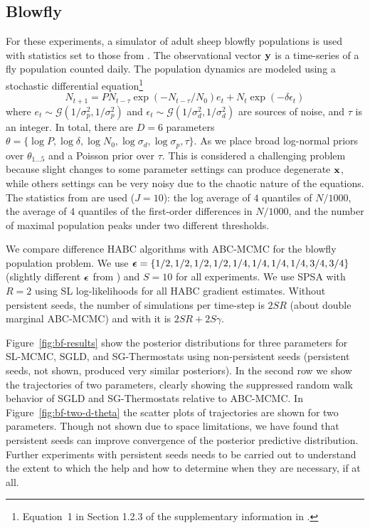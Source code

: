 \documentclass[]{article}
\begin{document}
\subsection{Blowfly}\label{sec:bf}
For these experiments, a simulator of adult sheep blowfly populations \cite{wood2010statistical} is used with statistics set to those from \cite{Meeds2014GpsUai}.  The observational vector ${\bf y}$ is a time-series of a fly population counted daily. The population dynamics are modeled using a stochastic differential equation\footnote{Equation~1 in Section 1.2.3 of the supplementary information in \cite{wood2010statistical}.}
\begin{equation}
N_{t+1} = P N_{t-\tau} \exp(-N_{t-\tau}/N_0) e_t + N_t \exp(-\delta \epsilon_t) \nonumber
\end{equation}
where $e_t \sim  \mathcal{G}( 1/{\sigma_p^2},1/{\sigma_p^2})$ and $\epsilon_t 
 \sim  \mathcal{G}( 1/{\sigma_d^2},1/{\sigma_d^2})$  
are sources of noise, and $\tau$ is an integer.  In total, there are $D=6$ parameters $\theta = \{ \log P, \log \delta, \log N_0, \log \sigma_d, \log \sigma_p, \tau\}$.  As \cite{Meeds2014GpsUai} we place broad log-normal priors over $\theta_{1\ldots 5}$ and a Poisson prior over $\tau$.  This is considered a challenging problem because slight changes to some parameter settings can produce degenerate ${\bf x}$, while others settings can be very noisy due to the chaotic nature of the equations.  The statistics from \cite{Meeds2014GpsUai} are used ($J=10$): the log average of $4$ quantiles of $N/1000$, the average of $4$ quantiles of the first-order differences in $N/1000$, and the number of maximal population peaks under two different thresholds. 

We compare difference HABC algorithms with ABC-MCMC for the blowfly population problem.  We use ${\bm {\epsilon}} = \{ 1/2,1/2,1/2,1/2, 1/4,1/4,1/4,1/4,3/4,3/4 \}$ (slightly different ${\bm {\epsilon}}$ from \cite{Meeds2014GpsUai}) and $S=10$ for all experiments.  We use SPSA with $R=2$ using SL log-likelihoods for all HABC gradient estimates.  Without persistent seeds, the number of simulations per time-step is $2 S R$ (about double marginal ABC-MCMC) and with it is $2SR+2S\gamma$.   

Figure~\ref{fig:bf-results} show the posterior distributions for three parameters for SL-MCMC, SGLD, and SG-Thermostats using non-persistent seeds (persistent seeds, not shown, produced very similar posteriors).  In the second row we show the trajectories of two parameters, clearly showing the suppressed random walk behavior of SGLD and SG-Thermostats relative to ABC-MCMC.  In Figure~\ref{fig:bf-two-d-theta} the scatter plots of trajectories are shown for two parameters.  
Though not shown due to space limitations, we have found that persistent seeds can improve convergence of the posterior predictive distribution.  Further experiments with persistent seeds needs to be carried out to understand the extent to which the help and how to determine when they are necessary, if at all.
\end{document}
